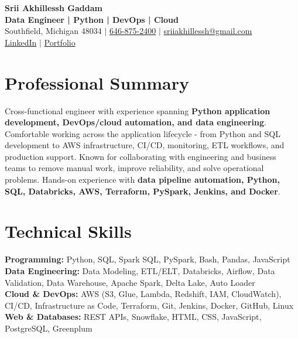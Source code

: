 \documentclass[letterpaper,10pt]{article}
\begin{document}
\fontsize{9.35pt}{10.45pt}\selectfont

\begin{center}
    {\LARGE \textbf{Srii Akhillessh Gaddam}} \\[-1pt]
    \textbf{Data Engineer | Python | DevOps | Cloud} \\[2pt]
    Southfield, Michigan 48034 $|$
    \href{tel:6468752400}{646-875-2400} $|$
    \href{mailto:sriiakhillessh@gmail.com}{sriiakhillessh@gmail.com} \\[1pt]
    \href{https://www.linkedin.com/in/srii-akhiilessh-gaddam-b48668191/}{LinkedIn} $|$
    \href{https://sriiakhillesshg.github.io/portfolio/}{Portfolio}
\end{center}
\vspace{-8pt}

\section{Professional Summary}
\small{Cross-functional engineer with experience spanning \textbf{Python application development, DevOps/cloud automation, and data engineering}. Comfortable working across the application lifecycle - from Python and SQL development to AWS infrastructure, CI/CD, monitoring, ETL workflows, and production support. Known for collaborating with engineering and business teams to remove manual work, improve reliability, and solve operational problems. Hands-on experience with \textbf{data pipeline automation, Python, SQL, Databricks, AWS, Terraform, PySpark, Jenkins, and Docker}.}

\section{Technical Skills}
\small{
\textbf{Programming:} Python, SQL, Spark SQL, PySpark, Bash, Pandas, JavaScript \\
\textbf{Data Engineering:} Data Modeling, ETL/ELT, Databricks, Airflow, Data Validation, Data Warehouse, Apache Spark, Delta Lake, Auto Loader \\
\textbf{Cloud \& DevOps:} AWS (S3, Glue, Lambda, Redshift, IAM, CloudWatch), CI/CD, Infrastructure as Code, Terraform, Git, Jenkins, Docker, GitHub, Linux \\
\textbf{Web \& Databases:} REST APIs, Snowflake, HTML, CSS, JavaScript, PostgreSQL, Greenplum
}
\end{document}
